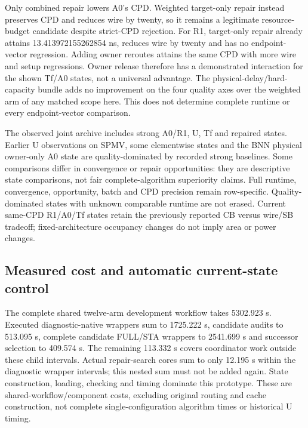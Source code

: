 Only combined repair lowers A0's CPD. Weighted target-only repair instead preserves CPD and reduces wire by twenty, so it remains a legitimate resource-budget candidate despite strict-CPD rejection. For R1, target-only repair already attains 13.413972155262854 ns, reduces wire by twenty and has no endpoint-vector regression. Adding owner reroutes attains the same CPD with more wire and setup regressions. Owner release therefore has a demonstrated interaction for the shown Tf/A0 states, not a universal advantage. The physical-delay/hard-capacity bundle adds no improvement on the four quality axes over the weighted arm of any matched scope here. This does not determine complete runtime or every endpoint-vector comparison.

The observed joint archive includes strong A0/R1, U, Tf and repaired states. Earlier U observations on SPMV, some elementwise states and the BNN physical owner-only A0 state are quality-dominated by recorded strong baselines. Some comparisons differ in convergence or repair opportunities: they are descriptive state comparisons, not fair complete-algorithm superiority claims. Full runtime, convergence, opportunity, batch and CPD precision remain row-specific. Quality-dominated states with unknown comparable runtime are not erased. Current same-CPD R1/A0/Tf states retain the previously reported CB versus wire/SB tradeoff; fixed-architecture occupancy changes do not imply area or power changes.

\subsection{Measured cost and automatic current-state control}
The complete shared twelve-arm development workflow takes 5302.923 s. Executed diagnostic-native wrappers sum to 1725.222 s, candidate audits to 513.095 s, complete candidate FULL/STA wrappers to 2541.699 s and successor selection to 409.574 s. The remaining 113.332 s covers coordinator work outside these child intervals. Actual repair-search cores sum to only 12.195 s within the diagnostic wrapper intervals; this nested sum must not be added again. State construction, loading, checking and timing dominate this prototype. These are shared-workflow/component costs, excluding original routing and cache construction, not complete single-configuration algorithm times or historical U timing.

